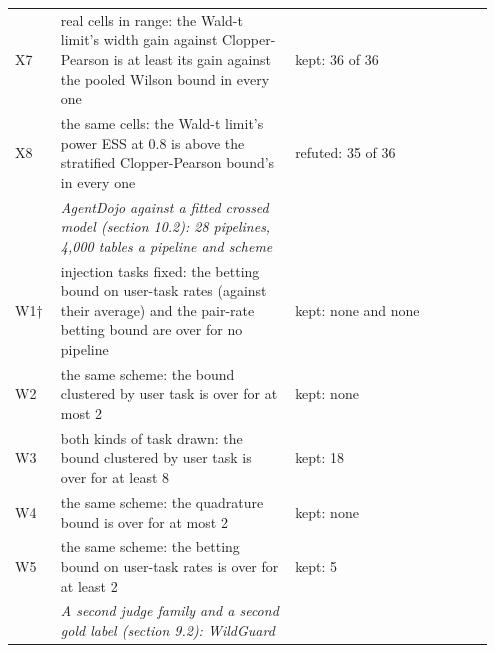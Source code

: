 \documentclass[11pt]{article}
\begin{document}
\begin{longtable}{@{}>{\raggedright\arraybackslash}p{0.093\linewidth}>{\raggedright\arraybackslash}p{0.461\linewidth}>{\raggedright\arraybackslash}p{0.392\linewidth}@{}}
\hspace{0pt}X7 & \hspace{0pt}real cells in range: the Wald-t limit's width gain against Clopper-Pearson is at least its gain against the pooled Wilson bound in every one & \hspace{0pt}kept: 36 of 36 \\
\hspace{0pt}X8 & \hspace{0pt}the same cells: the Wald-t limit's power ESS at 0.8 is above the stratified Clopper-Pearson bound's in every one & \hspace{0pt}refuted: 35 of 36 \\
 & \hspace{0pt}\emph{AgentDojo against a fitted crossed model (section 10.2): 28 pipelines, 4,000 tables a pipeline and scheme} &  \\
\hspace{0pt}W1† & \hspace{0pt}injection tasks fixed: the betting bound on user-task rates (against their average) and the pair-rate betting bound are over for no pipeline & \hspace{0pt}kept: none and none \\
\hspace{0pt}W2 & \hspace{0pt}the same scheme: the bound clustered by user task is over for at most 2 & \hspace{0pt}kept: none \\
\hspace{0pt}W3 & \hspace{0pt}both kinds of task drawn: the bound clustered by user task is over for at least 8 & \hspace{0pt}kept: 18 \\
\hspace{0pt}W4 & \hspace{0pt}the same scheme: the quadrature bound is over for at most 2 & \hspace{0pt}kept: none \\
\hspace{0pt}W5 & \hspace{0pt}the same scheme: the betting bound on user-task rates is over for at least 2 & \hspace{0pt}kept: 5 \\
 & \hspace{0pt}\emph{A second judge family and a second gold label (section 9.2): WildGuard} &  \\

\end{longtable}
\end{document}
